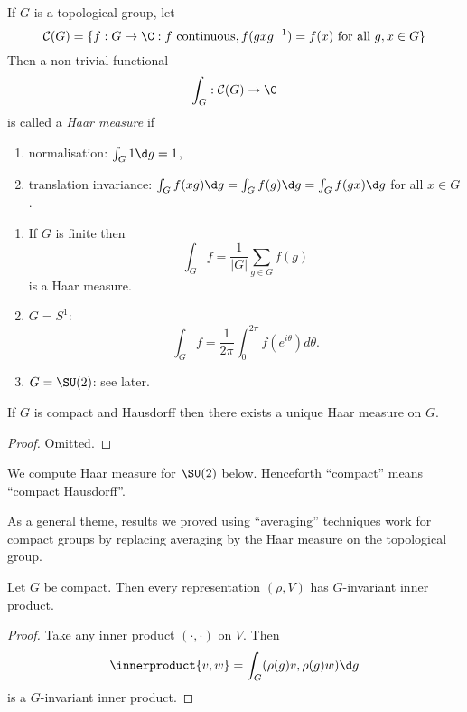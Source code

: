 \documentclass[a4paper]{article}
\newcommand*{\ip}{\innerproduct} %
\theoremstyle{definition}
\begin{document}
\begin{definition}
  If \(G\) is a topological group, let
  \[
    \mathcal C(G) = \{f: G \to \C: f \text{ continuous}, f(gxg^{-1}) = f(x) \text{ for all } g, x \in G\}
  \]
  Then a non-trivial functional
  \[
    \int_G: \mathcal C(G) \to \C
  \]
  is called a \emph{Haar measure} if
  \begin{enumerate}
  \item normalisation: \(\int_G 1 \d g = 1\),
  \item translation invariance: \(\int_G f(xg) \d g = \int_G f(g) \d g = \int_G f(gx) \d g\) for all \(x \in G\).
  \end{enumerate}
\end{definition}

\begin{eg}\leavevmode
  \begin{enumerate}
  \item If \(G\) is finite then
    \[
      \int_G f = \frac{1}{|G|} \sum_{g \in G} f(g)
    \]
    is a Haar measure.
  \item \(G = S^1\):
    \[
      \int_G f = \frac{1}{2\pi} \int_0^{2\pi} f(e^{i\theta}) d\theta.
    \]
  \item \(G = \SU(2)\): see later.
  \end{enumerate}
\end{eg}

\begin{theorem}
  If \(G\) is compact and Hausdorff then there exists a unique Haar measure on \(G\).
\end{theorem}

\begin{proof}
  Omitted.
\end{proof}

We compute Haar measure for \(\SU(2)\) below. Henceforth ``compact'' means ``compact Hausdorff''.

As a general theme, results we proved using ``averaging'' techniques work for compact groups by replacing averaging by the Haar measure on the topological group.

\begin{corollary}
  Let \(G\) be compact. Then every representation \((\rho, V)\) has \(G\)-invariant inner product.
\end{corollary}

\begin{proof}
  Take any inner product \((\cdot, \cdot)\) on \(V\). Then
  \[
    \ip{v, w} = \int_G (\rho(g) v, \rho(g) w) \d g
  \]
  is a \(G\)-invariant inner product.
\end{proof}
\end{document}
